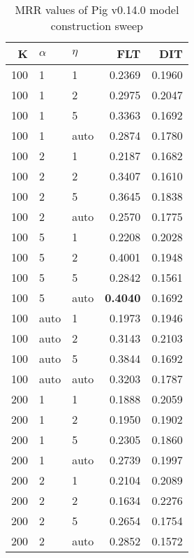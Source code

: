 
\begin{table}
\begin{spacing}{1.2}
\centering
\caption{MRR values of Pig v0.14.0 model construction sweep}
\label{table:pig_model_sweep}
\vspace{0.2em}
\parbox{.45\linewidth}{\centering \begin{tabular}{rll|rr}
\toprule
   K & $\alpha$ &   $\eta$ & FLT & DIT \\
\midrule
 100 &     1 &     1 &           0.2369 & 0.1960 \\
 100 &     1 &     2 &           0.2975 & 0.2047 \\
 100 &     1 &     5 &           0.3363 & 0.1692 \\
 100 &     1 &  auto &           0.2874 & 0.1780 \\
 100 &     2 &     1 &           0.2187 & 0.1682 \\
 100 &     2 &     2 &           0.3407 & 0.1610 \\
 100 &     2 &     5 &           0.3645 & 0.1838 \\
 100 &     2 &  auto &           0.2570 & 0.1775 \\
 100 &     5 &     1 &           0.2208 & 0.2028 \\
 100 &     5 &     2 &           0.4001 & 0.1948 \\
 100 &     5 &     5 &           0.2842 & 0.1561 \\
 100 &     5 &  auto &     {\bf 0.4040} & 0.1692 \\
 100 &  auto &     1 &           0.1973 & 0.1946 \\
 100 &  auto &     2 &           0.3143 & 0.2103 \\
 100 &  auto &     5 &           0.3844 & 0.1692 \\
 100 &  auto &  auto &           0.3203 & 0.1787 \\
 200 &     1 &     1 &           0.1888 & 0.2059 \\
 200 &     1 &     2 &           0.1950 & 0.1902 \\
 200 &     1 &     5 &           0.2305 & 0.1860 \\
 200 &     1 &  auto &           0.2739 & 0.1997 \\
 200 &     2 &     1 &           0.2104 & 0.2089 \\
 200 &     2 &     2 &           0.1634 & 0.2276 \\
 200 &     2 &     5 &           0.2654 & 0.1754 \\
 200 &     2 &  auto &           0.2852 & 0.1572 \\

\end{tabular}}
\end{spacing}
\end{table}
